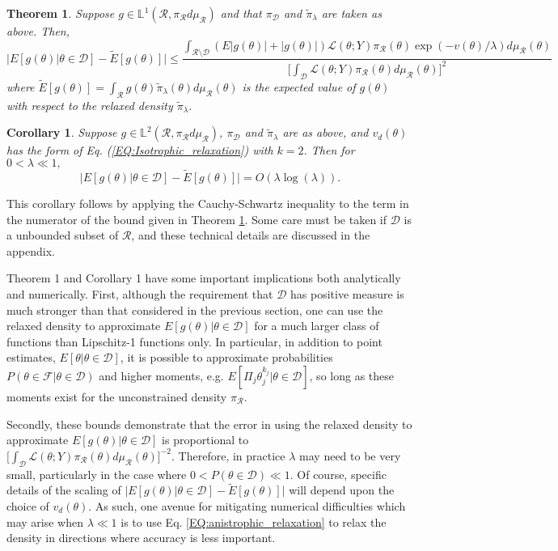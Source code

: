 \documentclass[12 point]{article}
\newtheorem{theorem_pos_measure}{Theorem}
\newtheorem{corollary}{Corollary}
\begin{document}
\begin{theorem_pos_measure}
\label{THM:positive_measure_approximation_error}
Suppose $g \in \mathbb{L}^1(\mathcal{R}, \pi_\mathcal{R}d\mu_\mathcal{R})$ and that $\pi_\mathcal{D}$ and $\tilde{\pi}_\lambda$ are taken as above.  Then,
$$\bigg|E[g(\theta) |\theta\in\mathcal{D}] - \tilde{E}[g(\theta)]   \bigg| \le \frac{\int_{\mathcal{R}\setminus \mathcal{D}} (E|g(\theta)|+|g(\theta)|) \mathcal{L}(\theta; Y) \pi_\mathcal{R}(\theta)\exp(-v(\theta)/\lambda ) d\mu_\mathcal{R}(\theta)}{\big[\int_\mathcal{D} \mathcal{L}(\theta; Y) \pi_\mathcal{R}(\theta)d\mu_\mathcal{R}(\theta)\big]^2 }$$
where $\tilde{E}[g(\theta)] = \int_\mathcal{R} g(\theta) \tilde{\pi}_\lambda(\theta)d\mu_\mathcal{R}(\theta)$ is the expected value of $g(\theta)$ with respect to the relaxed density $\tilde{\pi}_\lambda.$
\end{theorem_pos_measure}

\begin{corollary}
Suppose $g \in  \mathbb{L}^2(\mathcal{R}, \pi_\mathcal{R}d\mu_\mathcal{R})$,  $\pi_\mathcal{D}$ and $\tilde{\pi}_\lambda$ are as above, and $v_d(\theta)$ has the form of Eq. (\ref{EQ:Isotrophic_relaxation}) with $k=2$.  Then for $0<\lambda \ll 1,$
$$ \bigg|E[g(\theta) |\theta\in\mathcal{D}] - \tilde{E}[g(\theta)]   \bigg| = O(\lambda\log(\lambda)).$$
\end{corollary}
This corollary follows by applying the Cauchy-Schwartz inequality to the term in the numerator of the bound given in Theorem \ref{THM:positive_measure_approximation_error}.  Some care must be taken if $\mathcal{D}$ is a unbounded subset of $\mathcal{R}$, and these technical details are discussed in the appendix.

Theorem 1 and Corollary 1 have some important implications both analytically and numerically.  First, although the requirement that $\mathcal{D}$ has positive measure is much stronger than that considered in the previous section, one can use the relaxed density to approximate $E[g(\theta)|\theta\in\mathcal{D}]$ for a much larger class of functions than Lipschitz-1 functions only.  In particular, in addition to point estimates, $E[\theta|\theta\in\mathcal{D}]$, it is possible to approximate probabilities $P(\theta \in \mathcal{F}|\theta \in \mathcal{D})$ and higher moments, e.g. $E[\Pi_j \theta_j^{k_j} |\theta\in\mathcal{D}]$, so long as these moments exist for the unconstrained density $\pi_\mathcal{R}.$ 

Secondly, these bounds demonstrate that the error in using the relaxed density to approximate $E[g(\theta)|\theta\in\mathcal{D}]$ is proportional to $[\int_\mathcal{D}\mathcal{L}(\theta; Y)  \pi_\mathcal{R}(\theta)d\mu_\mathcal{R}(\theta)\big]^{-2}.$  Therefore, in practice $\lambda$ may need to be very small, particularly in the case where $0<P(\theta\in\mathcal{D})\ll 1.$ Of course, specific details of the scaling of $\bigg|E[g(\theta) |\theta\in\mathcal{D}] - \tilde{E}[g(\theta)]   \bigg|$ will depend upon the choice of $v_d(\theta)$. As such, one avenue for mitigating numerical difficulties which may arise when $\lambda \ll 1$ is to use Eq. \ref{EQ:anistrophic_relaxation} to relax the density in directions where accuracy is less important.
\end{document}
